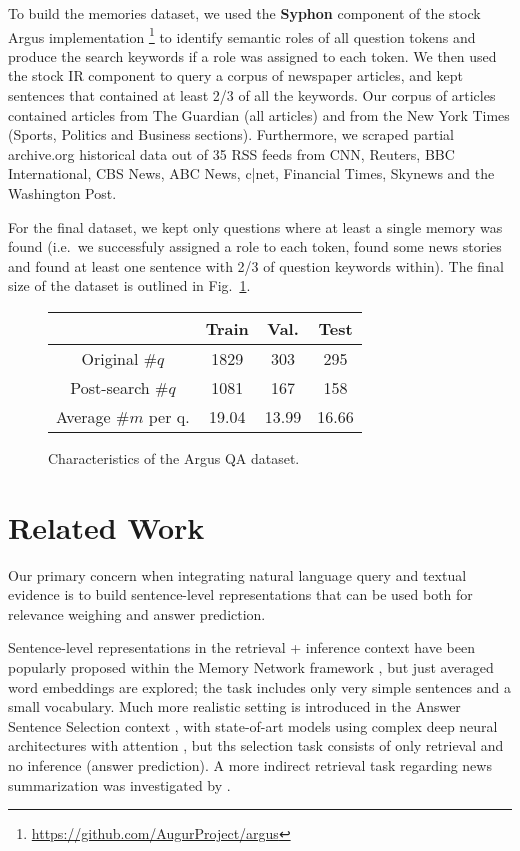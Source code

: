 \documentclass[11pt]{article}
\begin{document}
To build the memories dataset, we used the \textbf{Syphon} component
\cite{argus}
of the stock Argus implementation%
\footnote{\url{https://github.com/AugurProject/argus}}
to identify semantic roles of all question tokens and produce
the search keywords if a role was assigned to each token.
We then used the stock IR component to query a corpus of newspaper
articles, and kept sentences that contained at least 2/3 of all
the keywords.
Our corpus of articles contained articles from The Guardian (all articles) and from the New York Times (Sports, Politics and Business sections).  Furthermore, we scraped partial archive.org historical data out of 35 RSS feeds from CNN, Reuters, BBC International, CBS News, ABC News, c|net, Financial Times, Skynews and the Washington Post.

For the final dataset, we kept only questions where at least
a single memory was found (i.e.\ we successfuly assigned a role
to each token, found some news stories and found at least one
sentence with 2/3 of question keywords within).  The final size
of the dataset is outlined in Fig.~\ref{tab:dataset}.

\begin{figure}
	\centering
	\begin{tabular}{|c|ccc|}
		\hline
		& Train & Val. & Test \\
		\hline
		Original $\#q$ & 1829 & 303 & 295 \\
		Post-search $\#q$ & 1081 & 167 & 158 \\
		Average $\#m$ per q. & 19.04 & 13.99 & 16.66 \\
		\hline
	\end{tabular}
	\vspace*{-0.2cm}
	\caption{\footnotesize%
		Characteristics of the Argus QA dataset.
	}
	\label{tab:dataset}
\end{figure}


\section{Related Work}
\label{sec:relwork}

Our primary concern when integrating natural language query and
textual evidence is to build sentence-level representations that
can be used both for relevance weighing and answer prediction.

Sentence-level representations in the retrieval + inference context have been
popularly proposed within the Memory Network framework \cite{MemNN},
but just averaged word embeddings are explored; the task includes
only very simple sentences and a small vocabulary.
Much more realistic setting is introduced in the Answer Sentence Selection
context \cite{AnsselWang} \cite{sps}, with state-of-art models using complex
deep neural architectures with attention \cite{attnpooling}, but ths selection
task consists of only retrieval and no inference (answer prediction).
A more indirect retrieval task regarding news summarization was investigated
by \cite{AttSum}.
\end{document}
